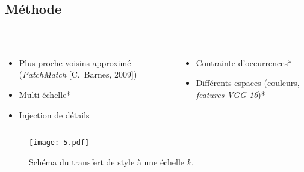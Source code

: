 \documentclass[aspectratio=169, 22pt]{beamer}
\begin{document}
\subsection{Méthode}
\begin{frame}{\secname~- \subsecname}
  \begin{columns}
    \begin{column}{0.5\linewidth}
      \begin{itemize}
      \item Plus proche voisins approximé (\emph{PatchMatch} [C.~Barnes, 2009])
      \item Multi-échelle*
      \item Injection de détails
      \end{itemize}
    \end{column}
    \begin{column}{0.5\linewidth}
      \begin{itemize}
      \item Contrainte d'occurrences*
      \item Différents espaces (couleurs, \emph{features VGG-16})*
      \end{itemize}
    \end{column}
  \end{columns}
  \begin{figure}
    \centering
    \texttt{[image: 5.pdf]}
    \caption{Schéma du transfert de style à une échelle $k$.}
  \end{figure}
\end{frame}
\end{document}
